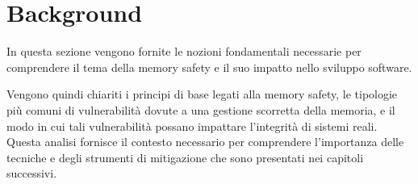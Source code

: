 \chapter{Background}
\label{cha:background}

In questa sezione vengono fornite le nozioni fondamentali necessarie per
comprendere il tema della memory safety e il suo impatto nello sviluppo software.

Vengono quindi chiariti i principi di base legati alla memory safety, le tipologie
più comuni di vulnerabilità dovute a una gestione scorretta della memoria, e il
modo in cui tali vulnerabilità possano impattare l'integrità di sistemi reali. Questa
analisi fornisce il contesto necessario per comprendere l'importanza delle tecniche
e degli strumenti di mitigazione che sono presentati nei capitoli successivi.



